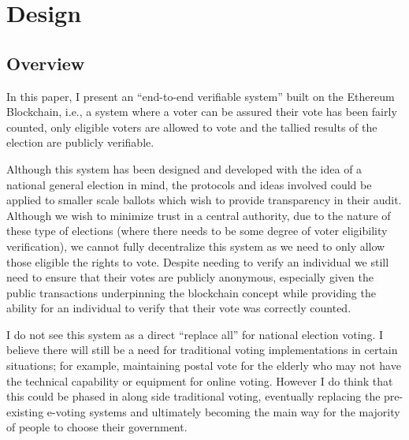 \documentclass{article}
\begin{document}
    \section{Design}
    
    \subsection{Overview}
    
In this paper, I present an ``end-to-end verifiable system'' built on the Ethereum Blockchain, i.e., a system where a voter can be assured their vote has been fairly counted, only eligible voters are allowed to vote and the tallied results of the election are publicly verifiable.

Although this system has been designed and developed with the idea of a national general election in mind, the protocols and ideas involved could be applied to smaller scale ballots which wish to provide transparency in their audit. Although we wish to minimize trust in a central authority, due to the nature of these type of elections (where there needs to be some degree of voter eligibility verification), we cannot fully decentralize this system as we need to only allow those eligible the rights to vote. Despite needing to verify an individual we still need to ensure that their votes are publicly anonymous, especially given the public transactions underpinning the blockchain concept while providing the ability for an individual to verify that their vote was correctly counted.

I do not see this system as a direct ``replace all'' for national election voting. I believe there will still be a need for traditional voting implementations in certain situations; for example, maintaining postal vote for the elderly who may not have the technical capability or equipment for online voting. However I do think that this could be phased in along side traditional voting, eventually replacing the pre-existing e-voting systems and ultimately becoming the main way for the majority of people to choose their government. 
\end{document}
